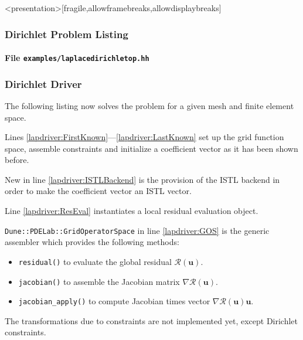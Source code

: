 \begin{frame}<presentation>[fragile,allowframebreaks,allowdisplaybreaks]
\frametitle<presentation>{Dirichlet Problem Listing}
\framesubtitle<presentation>{File \texttt{examples/laplacedirichletop.hh}}

\end{frame}

\begin{frame}
\frametitle<presentation>{Dirichlet Driver}
The following listing now solves the problem for a given mesh and
finite element space.

Lines \ref{lapdriver:FirstKnown}---\ref{lapdriver:LastKnown} set up
the grid function space, assemble constraints and initialize a
coefficient vector as it has been shown before.

New in line \ref{lapdriver:ISTLBackend} is the provision of the ISTL
backend in order to make the coefficient vector an ISTL vector.

Line \ref{lapdriver:ResEval} instantiates a local residual evaluation
object.

\lstinline{Dune::PDELab::GridOperatorSpace} in
line \ref{lapdriver:GOS} is the generic assembler which provides the
following methods:
\begin{itemize}
\item \lstinline{residual()} to evaluate the global residual
$\mathcal{R}(\mathbf{u})$.
\item \lstinline{jacobian()} to assemble the Jacobian matrix
$\nabla\mathcal{R}(\mathbf{u})$.
\item \lstinline{jacobian_apply()} to compute Jacobian times vector
$\nabla\mathcal{R}(\mathbf{u})\mathbf{u}$.
\end{itemize}
The transformations due to constraints are not implemented yet, except
Dirichlet constraints.
\end{frame}

